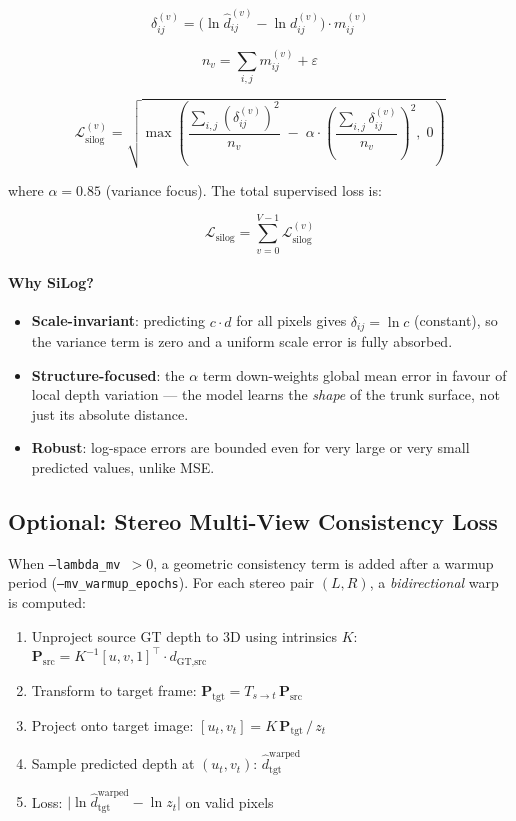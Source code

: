 \documentclass[11pt]{article}
\begin{document}
\[
\delta^{(v)}_{ij} = \bigl(\ln \hat{d}^{(v)}_{ij} - \ln d^{(v)}_{ij}\bigr) \cdot m^{(v)}_{ij}
\]

\[
n_v = \sum_{i,j} m^{(v)}_{ij} + \varepsilon
\]

\[
\mathcal{L}_{\text{silog}}^{(v)}
= \sqrt{\max\!\left(
    \frac{\sum_{i,j} (\delta^{(v)}_{ij})^2}{n_v}
    \;-\;
    \alpha \cdot \left(\frac{\sum_{i,j} \delta^{(v)}_{ij}}{n_v}\right)^{\!2},\;
    0
  \right)}
\]

where $\alpha = 0.85$ (variance focus).  The total supervised loss is:

\[
\mathcal{L}_{\text{silog}} = \sum_{v=0}^{V-1} \mathcal{L}_{\text{silog}}^{(v)}
\]

\paragraph{Why SiLog?}
\begin{itemize}[leftmargin=2em, noitemsep]
  \item \textbf{Scale-invariant}: predicting $c \cdot \hat{d}$ for all pixels
        gives $\delta_{ij} = \ln c$ (constant), so the variance term is zero and
        a uniform scale error is fully absorbed.
  \item \textbf{Structure-focused}: the $\alpha$ term down-weights global mean
        error in favour of local depth variation --- the model learns the
        \emph{shape} of the trunk surface, not just its absolute distance.
  \item \textbf{Robust}: log-space errors are bounded even for very large or
        very small predicted values, unlike MSE.
\end{itemize}

\subsection{Optional: Stereo Multi-View Consistency Loss}

When \texttt{--lambda\_mv $> 0$}, a geometric consistency term is added after a
warmup period (\texttt{--mv\_warmup\_epochs}).  For each stereo pair $(L, R)$,
a \emph{bidirectional} warp is computed:

\begin{enumerate}[leftmargin=2em]
  \item Unproject source GT depth to 3D using intrinsics $K$:
        $\mathbf{P}_\text{src} = K^{-1}[u,v,1]^\top \cdot d_\text{GT,src}$
  \item Transform to target frame: $\mathbf{P}_\text{tgt} = T_{s\to t}\, \mathbf{P}_\text{src}$
  \item Project onto target image: $[u_t, v_t] = K\,\mathbf{P}_\text{tgt} \,/\, z_t$
  \item Sample predicted depth at $(u_t, v_t)$: $\hat{d}_\text{tgt}^{\text{warped}}$
  \item Loss: $\bigl|\ln \hat{d}_\text{tgt}^{\text{warped}} - \ln z_t\bigr|$ on valid pixels
\end{enumerate}
\end{document}

